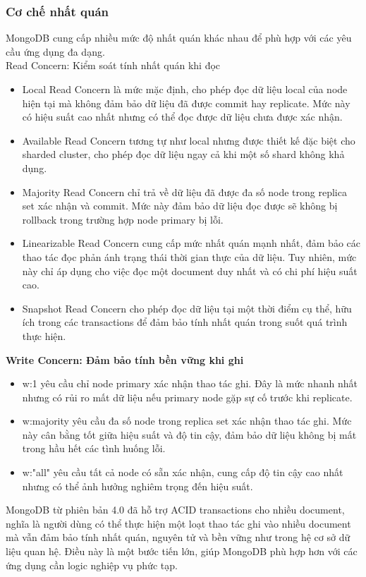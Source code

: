 \documentclass[conference]{IEEEtran}
\begin{document}
\subsubsection{Cơ chế nhất quán}
MongoDB cung cấp nhiều mức độ nhất quán khác nhau để phù hợp với các yêu cầu ứng dụng đa dạng.\\
Read Concern: Kiểm soát tính nhất quán khi đọc
\begin{itemize}
    \item Local Read Concern là mức mặc định, cho phép đọc dữ liệu local của node hiện tại mà không đảm bảo dữ liệu đã được commit hay replicate. Mức này có hiệu suất cao nhất nhưng có thể đọc được dữ liệu chưa được xác nhận. 
    \item Available Read Concern tương tự như local nhưng được thiết kế đặc biệt cho sharded cluster, cho phép đọc dữ liệu ngay cả khi một số shard không khả dụng. 
    \item Majority Read Concern chỉ trả về dữ liệu đã được đa số node trong replica set xác nhận và commit. Mức này đảm bảo dữ liệu đọc được sẽ không bị rollback trong trường hợp node primary bị lỗi. 
    \item Linearizable Read Concern cung cấp mức nhất quán mạnh nhất, đảm bảo các thao tác đọc phản ánh trạng thái thời gian thực của dữ liệu. Tuy nhiên, mức này chỉ áp dụng cho việc đọc một document duy nhất và có chi phí hiệu suất cao. 
    \item Snapshot Read Concern cho phép đọc dữ liệu tại một thời điểm cụ thể, hữu ích trong các transactions để đảm bảo tính nhất quán trong suốt quá trình thực hiện.\cite{mongodbtrans}
\end{itemize}
    
\textbf{Write Concern: Đảm bảo tính bền vững khi ghi}
\begin{itemize}
\item w:1 yêu cầu chỉ node primary xác nhận thao tác ghi.
Đây là mức nhanh nhất nhưng có rủi ro mất dữ liệu nếu primary node gặp sự cố trước khi replicate. 
\item w:majority yêu cầu đa số node trong replica set xác nhận thao tác ghi. Mức này cân bằng tốt giữa hiệu suất và độ tin cậy, đảm bảo dữ liệu không bị mất trong hầu hết các tình huống lỗi. 
\item w:"all" yêu cầu tất cả node có sẵn xác nhận, cung cấp độ tin cậy cao nhất nhưng có thể ảnh hưởng nghiêm trọng đến hiệu suất.\cite{mongodbtrans,ozsu-2019} 
\end{itemize}
MongoDB từ phiên bản 4.0 đã hỗ trợ ACID transactions cho nhiều document, nghĩa là người dùng có thể thực hiện một loạt thao tác ghi vào nhiều document mà vẫn đảm bảo tính nhất quán, nguyên tử và bền vững như trong hệ cơ sở dữ liệu quan hệ. Điều này là một bước tiến lớn, giúp MongoDB phù hợp hơn với các ứng dụng cần logic nghiệp vụ phức tạp.
\end{document}
